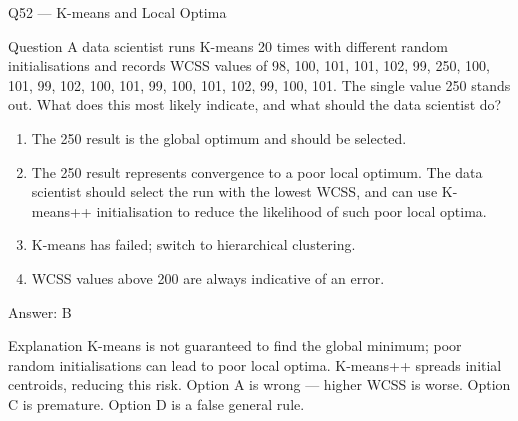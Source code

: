 \documentclass[aspectratio=169,8pt]{beamer}
\begin{document}
	\begin{frame}{Q52 --- K-means and Local Optima}
		\begin{block}{Question}
			A data scientist runs K-means 20 times with different random initialisations and records WCSS values of 98, 100, 101, 101, 102, 99, 250, 100, 101, 99, 102, 100, 101, 99, 100, 101, 102, 99, 100, 101. The single value 250 stands out. What does this most likely indicate, and what should the data scientist do?
		\end{block}
		\begin{enumerate}
			\item The 250 result is the global optimum and should be selected.
			\item The 250 result represents convergence to a poor local optimum. The data scientist should select the run with the lowest WCSS, and can use K-means++ initialisation to reduce the likelihood of such poor local optima.
			\item K-means has failed; switch to hierarchical clustering.
			\item WCSS values above 200 are always indicative of an error.
		\end{enumerate}
		\begin{exampleblock}{Answer: B}\end{exampleblock}
		\begin{block}{Explanation}
			K-means is not guaranteed to find the global minimum; poor random initialisations can lead to poor local optima. K-means++ spreads initial centroids, reducing this risk. Option A is wrong --- higher WCSS is worse. Option C is premature. Option D is a false general rule.
		\end{block}
	\end{frame}
\end{document}
